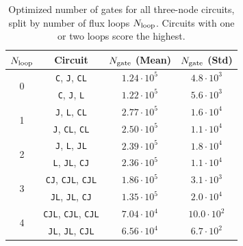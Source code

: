 \begin{table}[htbp]
\setlength{\tabcolsep}{6.4pt}
\centering
\begin{tabular}{cccc}
\toprule
$N_{\rm loop}$ & Circuit & $N_{\rm gate}$ (Mean) & $N_{\rm gate}$ (Std) \\ \toprule
\multirow{2}{*}{0}& \texttt{C}, \texttt{J}, \texttt{CL} & $1.24\cdot10^{5}$ & $4.8\cdot10^{3}$ \\
& \texttt{C}, \texttt{J}, \texttt{L} & $1.22\cdot10^{5}$ & $5.6\cdot10^{3}$ \\
\midrule
\multirow{2}{*}{1}& \texttt{J}, \texttt{L}, \texttt{CL} & $2.77\cdot10^{5}$ & $1.6\cdot10^{4}$ \\
& \texttt{J}, \texttt{CL}, \texttt{CL} & $2.50\cdot10^{5}$ & $1.1\cdot10^{4}$ \\
\midrule
\multirow{2}{*}{2}& \texttt{J}, \texttt{L}, \texttt{JL} & $2.39\cdot10^{5}$ & $1.8\cdot10^{4}$ \\
& \texttt{L}, \texttt{JL}, \texttt{CJ} & $2.36\cdot10^{5}$ & $1.1\cdot10^{4}$ \\
\midrule
\multirow{2}{*}{3}& \texttt{CJ}, \texttt{CJL}, \texttt{CJL} & $1.86\cdot10^{5}$ & $3.1\cdot10^{3}$ \\
& \texttt{JL}, \texttt{JL}, \texttt{CJ} & $1.35\cdot10^{5}$ & $2.0\cdot10^{4}$ \\
\midrule
\multirow{2}{*}{4}& \texttt{CJL}, \texttt{CJL}, \texttt{CJL} & $7.04\cdot10^{4}$ & $10.0\cdot10^{2}$ \\
& \texttt{JL}, \texttt{JL}, \texttt{CJL} & $6.56\cdot10^{4}$ & $6.7\cdot10^{2}$ \\
\bottomrule
\end{tabular}
    \caption{Optimized number of gates for all three-node circuits, split by number of flux loops $N_{\rm loop}$. Circuits with one or two loops score the highest.} 
    \label{tab:optim_loops}
\end{table}


